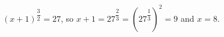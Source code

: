 $(x+1)^{\dfrac{3}{2}}=27$, so $x+1=27^{\dfrac{2}{3}}=\left(27^{\dfrac{1}{3}}\right)^2=9$ and $x=\boxed{8}$.
